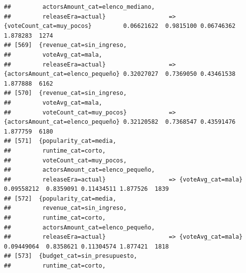 \documentclass[
]{article}
\begin{document}
\begin{verbatim}
##         actorsAmount_cat=elenco_mediano,                                                                                        
##         releaseEra=actual}                  => {voteCount_cat=muy_pocos}         0.06621622  0.9815100 0.06746362 1.878283  1274
## [569]  {revenue_cat=sin_ingreso,                                                                                                
##         voteAvg_cat=mala,                                                                                                       
##         releaseEra=actual}                  => {actorsAmount_cat=elenco_pequeño} 0.32027027  0.7369050 0.43461538 1.877888  6162
## [570]  {revenue_cat=sin_ingreso,                                                                                                
##         voteAvg_cat=mala,                                                                                                       
##         voteCount_cat=muy_pocos}            => {actorsAmount_cat=elenco_pequeño} 0.32120582  0.7368547 0.43591476 1.877759  6180
## [571]  {popularity_cat=media,                                                                                                   
##         runtime_cat=corto,                                                                                                      
##         voteCount_cat=muy_pocos,                                                                                                
##         actorsAmount_cat=elenco_pequeño,                                                                                        
##         releaseEra=actual}                  => {voteAvg_cat=mala}                0.09558212  0.8359091 0.11434511 1.877526  1839
## [572]  {popularity_cat=media,                                                                                                   
##         revenue_cat=sin_ingreso,                                                                                                
##         runtime_cat=corto,                                                                                                      
##         actorsAmount_cat=elenco_pequeño,                                                                                        
##         releaseEra=actual}                  => {voteAvg_cat=mala}                0.09449064  0.8358621 0.11304574 1.877421  1818
## [573]  {budget_cat=sin_presupuesto,                                                                                             
##         runtime_cat=corto,                                                                                                      

\end{verbatim}
\end{document}
